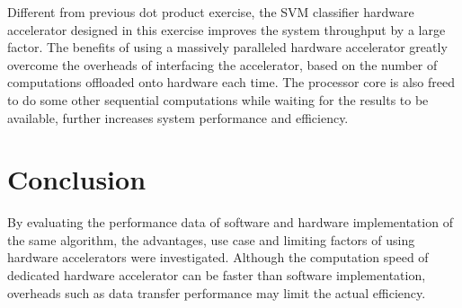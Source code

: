 \documentclass[journal]{IEEEtran}
\begin{document}
Different from previous dot product exercise, the SVM classifier hardware accelerator designed in this exercise improves the system throughput by a large factor. The benefits of using a massively paralleled hardware accelerator greatly overcome the overheads of interfacing the accelerator, based on the number of computations offloaded onto hardware each time. The processor core is also freed to do some other sequential computations while waiting for the results to be available, further increases system performance and efficiency.

\section{Conclusion}

By evaluating the performance data of software and hardware implementation of the same algorithm, the advantages, use case and limiting factors of using hardware accelerators were investigated. Although the computation speed of dedicated hardware accelerator can be faster than software implementation, overheads such as data transfer performance may limit the actual efficiency.




\end{document}
